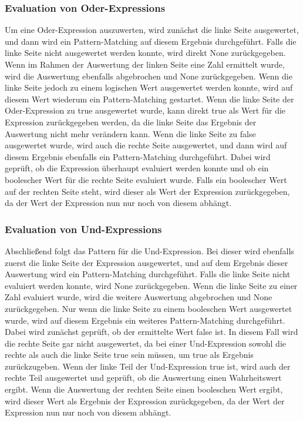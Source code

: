 \documentclass[a4paper, 1ppt]{article}
\begin{document}
\subsubsection{Evaluation von Oder-Expressions}
Um eine Oder-Expression auszuwerten, wird zunächst die linke Seite ausgewertet, und dann wird ein Pattern-Matching auf diesem Ergebnis durchgeführt. Falls die linke Seite nicht ausgewertet werden konnte, wird direkt None zurückgegeben. Wenn im Rahmen der Auswertung der linken Seite eine Zahl ermittelt wurde, wird die Auswertung ebenfalls abgebrochen und None zurückgegeben. Wenn die linke Seite jedoch zu einem logischen Wert ausgewertet werden konnte, wird auf diesem Wert wiederum ein Pattern-Matching gestartet. Wenn die linke Seite der Oder-Expression zu true ausgewertet wurde, kann direkt true als Wert für die Expression zurückgegeben werden, da die linke Seite das Ergebnis der Auswertung nicht mehr verändern kann. Wenn die linke Seite zu false ausgewertet wurde, wird auch die rechte Seite ausgewertet, und dann wird auf diesem Ergebnis ebenfalls ein Pattern-Matching durchgeführt. Dabei wird geprüft, ob die Expression überhaupt evaluiert werden konnte und ob ein boolescher Wert für die rechte Seite evaluiert wurde. Falls ein boolescher Wert auf der rechten Seite steht, wird dieser als Wert der Expression zurückgegeben, da der Wert der Expression nun nur noch von diesem abhängt.
\newline
\subsubsection{Evaluation von Und-Expressions}
Abschließend folgt das Pattern für die Und-Expression. Bei dieser wird ebenfalls zuerst die linke Seite der Expression ausgewertet, und auf dem Ergebnis dieser Auswertung wird ein Pattern-Matching durchgeführt. Falls die linke Seite nicht evaluiert werden konnte, wird None zurückgegeben. Wenn die linke Seite zu einer Zahl evaluiert wurde, wird die weitere Auswertung abgebrochen und None zurückgegeben. Nur wenn die linke Seite zu einem booleschen Wert ausgewertet wurde, wird auf diesem Ergebnis ein weiteres Pattern-Matching durchgeführt. Dabei wird zunächst geprüft, ob der ermittelte Wert false ist. In diesem Fall wird die rechte Seite gar nicht ausgewertet, da bei einer Und-Expression sowohl die rechte als auch die linke Seite true sein müssen, um true als Ergebnis zurückzugeben. Wenn der linke Teil der Und-Expression true ist, wird auch der rechte Teil ausgewertet und geprüft, ob die Auswertung einen Wahrheitswert ergibt. Wenn die Auswertung der rechten Seite einen booleschen Wert ergibt, wird dieser Wert als Ergebnis der Expression zurückgegeben, da der Wert der Expression nun nur noch von diesem abhängt.
\end{document}

